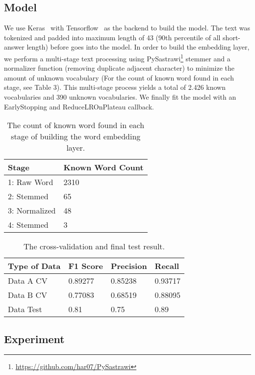 \documentclass[11pt,a4paper]{article}
\begin{document}
\subsection{Model}

We use Keras~\cite{Keras} with Tensorflow~\cite{Tensorflow} as the backend to build the model. The text was tokenized and padded into maximum length of 43 (90th percentile of all short-answer length) before goes into the model. In order to build the embedding layer, we perform a multi-stage text processing using PySastrawi\footnote{\url{https://github.com/har07/PySastrawi}} stemmer and a normalizer function (removing duplicate adjacent character) to minimize the amount of unknown vocabulary (For the count of known word found in each stage, see Table 3). This multi-stage process yields a total of 2.426 known vocabularies and 390 unknown vocabularies. We finally fit the model with an EarlyStopping and ReduceLROnPlateau callback.

\begin{table}
\centering
\small
\begin{tabular}{|l|l|}
\hline
\textbf{Stage} & \textbf{Known Word Count}\\\hline
{1: Raw Word} & {2310}\\ 
{2: Stemmed} & {65}\\
{3: Normalized} & {48}\\ 
{4: Stemmed} & {3}\\\hline
\end{tabular} 
\caption{The count of known word found in each stage of building the word embedding layer.}
\end{table}

\begin{table}
\centering
\small
\begin{tabular}{|l|l|l|l|}
\hline
\textbf{Type of Data} & \textbf{F1 Score} & \textbf{Precision} & \textbf{Recall}\\\hline
{Data A CV} & {0.89277} & {0.85238} & {0.93717}\\ 
{Data B CV} & {0.77083} & {0.68519} & {0.88095}\\
{Data Test} & {0.81} & {0.75} & {0.89}\\ \hline
\end{tabular} 
\caption{The cross-validation and final test result.}
\end{table}

\subsection{Experiment}
\end{document}
